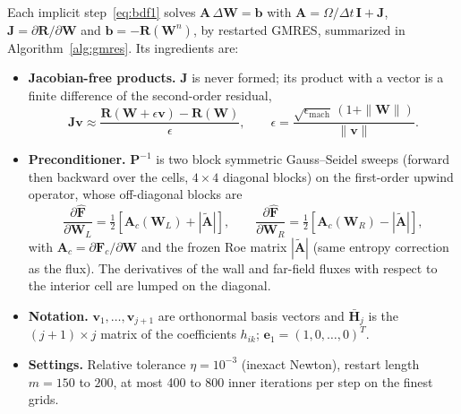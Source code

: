 \documentclass[12pt,a4paper]{article}
\begin{document}
Each implicit step~\eqref{eq:bdf1} solves $\mathbf{A}\,\Delta\mathbf{W}=\mathbf{b}$ with
$\mathbf{A}=\Omega/\Delta t\,\mathbf{I}+\mathbf{J}$, $\mathbf{J}=\partial\mathbf{R}/\partial\mathbf{W}$
and $\mathbf{b}=-\mathbf{R}(\mathbf{W}^n)$, by restarted GMRES, summarized in
Algorithm~\ref{alg:gmres}. Its ingredients are:
\begin{itemize}
  \item \textbf{Jacobian-free products.} $\mathbf{J}$ is never formed; its product with a vector is
  a finite difference of the second-order residual,
  \begin{equation}
    \mathbf{J}\mathbf{v}\approx\frac{\mathbf{R}(\mathbf{W}+\epsilon\mathbf{v})-\mathbf{R}(\mathbf{W})}{\epsilon},
    \qquad
    \epsilon=\frac{\sqrt{\epsilon_{\mathrm{mach}}}\,(1+\|\mathbf{W}\|)}{\|\mathbf{v}\|}.
    \label{eq:jfnk}
  \end{equation}
  \item \textbf{Preconditioner.} $\mathbf{P}^{-1}$ is two block symmetric Gauss--Seidel sweeps
  (forward then backward over the cells, $4\times4$ diagonal blocks) on the first-order upwind
  operator, whose off-diagonal blocks are
  \begin{equation}
    \frac{\partial\widehat{\mathbf{F}}}{\partial\mathbf{W}_L}=\tfrac12\left[\mathbf{A}_c(\mathbf{W}_L)+|\tilde{\mathbf{A}}|\right],
    \qquad
    \frac{\partial\widehat{\mathbf{F}}}{\partial\mathbf{W}_R}=\tfrac12\left[\mathbf{A}_c(\mathbf{W}_R)-|\tilde{\mathbf{A}}|\right],
    \label{eq:jac1}
  \end{equation}
  with $\mathbf{A}_c=\partial\mathbf{F}_c/\partial\mathbf{W}$ and the frozen Roe matrix
  $|\tilde{\mathbf{A}}|$ (same entropy correction as the flux). The derivatives of the wall and
  far-field fluxes with respect to the interior cell are lumped on the diagonal.
  \item \textbf{Notation.} $\mathbf{v}_1,\dots,\mathbf{v}_{j+1}$ are orthonormal basis vectors and
  $\bar{\mathbf{H}}_j$ is the $(j+1)\times j$ matrix of the coefficients $h_{ik}$; $\mathbf{e}_1=(1,0,\dots,0)^T$.
  \item \textbf{Settings.} Relative tolerance $\eta=10^{-3}$ (inexact Newton), restart length
  $m=150$ to $200$, at most 400 to 800 inner iterations per step on the finest grids.
\end{itemize}
\end{document}
